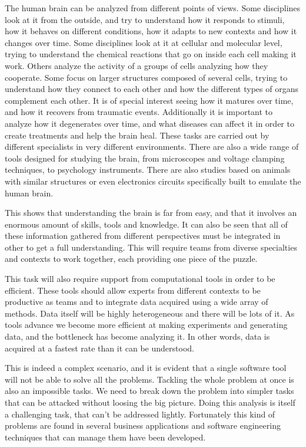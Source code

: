 
The human brain can be analyzed from different points of views. Some disciplines look at it from the outside, and try to understand how it responds to stimuli, how it behaves on different conditions, how it adapts to new contexts and how it changes over time. Some disciplines look at it at cellular and molecular level, trying to understand the chemical reactions that go on inside each cell making it work. Others analyze the activity of a groups of cells analyzing how they cooperate. Some focus on larger structures composed of several cells, trying to understand how they connect to each other and how the different types of organs complement each other. It is of special interest seeing how it matures over time, and how it recovers from traumatic events. Additionally it is important to analyze how it degenerates over time, and what diseases can affect it in order to create treatments and help the brain heal. 
These tasks are carried out by different specialists in very different environments. There are also a wide range of tools designed for studying the brain, from microscopes and voltage clamping techniques, to psychology instruments. There are also studies based on animals with similar structures or even electronics circuits specifically built to emulate the human brain. 

This shows that understanding the brain is far from easy, and that it involves an enormous amount of skills, tools and knowledge. It can also be seen that all of these information gathered from different perspectives must be integrated in other to get a full understanding. This will require teams from diverse specialties and contexts to work together, each providing one piece of the puzzle. 

This task will also require support from computational tools in order to be efficient. These tools should allow experts from different contexts to be productive as teams and to integrate data acquired using a wide array of methods. Data itself will be highly heterogeneous and there will be lots of it. As tools advance we become more efficient at making experiments and generating data, and the bottleneck has become analyzing it. In other words, data is acquired at a fastest rate than it can be understood. 

This is indeed a complex scenario, and it is evident that a single software tool will not be able to solve all the problems. Tackling the whole problem at once is also an impossible tasks. We need to break down the problem into simpler tasks that can be attacked without loosing the big picture. Doing this analysis is itself a challenging task, that can't be addressed lightly. Fortunately this kind of problems are found in several business applications and  software engineering techniques that can manage them have been developed. 

